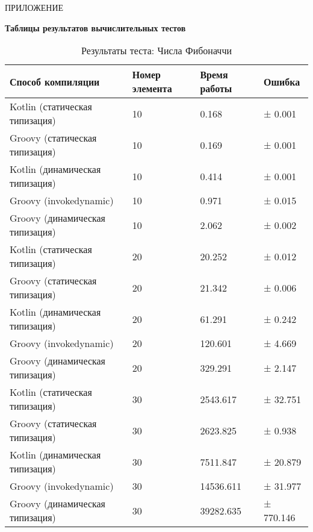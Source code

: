 \vfill
\clearpage
\appendix


    \hfill ПРИЛОЖЕНИЕ 
    \begin{center}
        \bf{Таблицы результатов вычислительных тестов}
    \end{center}
    \markboth{\MakeUppercase{}}{}
    
    \begin{table}[h]
\caption{\label{tab:fibBenchResults}Результаты теста: Числа Фибоначчи}
\begin{center}
\begin{tabular}{|l|p{}|l|l|}
\hline
Способ компиляции & Номер элемента & Время работы & Ошибка \\
\hline
Kotlin (статическая типизация)           & 10  &     0.168 & ±   0.001  \\
Groovy (статическая типизация)           & 10  &     0.169 & ±   0.001  \\
Kotlin (динамическая типизация)          & 10  &     0.414 & ±   0.001  \\
Groovy (invokedynamic)                   & 10  &     0.971 & ±   0.015  \\
Groovy (динамическая типизация)          & 10  &     2.062 & ±   0.002  \\
Kotlin (статическая типизация)           & 20  &    20.252 & ±   0.012  \\
Groovy (статическая типизация)           & 20  &    21.342 & ±   0.006  \\
Kotlin (динамическая типизация)          & 20  &    61.291 & ±   0.242  \\
Groovy (invokedynamic)                   & 20  &   120.601 & ±   4.669  \\
Groovy (динамическая типизация)          & 20  &   329.291 & ±   2.147  \\
Kotlin (статическая типизация)           & 30  &  2543.617 & ±  32.751  \\
Groovy (статическая типизация)           & 30  &  2623.825 & ±   0.938  \\
Kotlin (динамическая типизация)          & 30  &  7511.847 & ±  20.879  \\
Groovy (invokedynamic)                   & 30  & 14536.611 & ±  31.977  \\
Groovy (динамическая типизация)          & 30  & 39282.635 & ± 770.146  \\
\hline
\end{tabular}
\end{center}
\end{table} 
    
